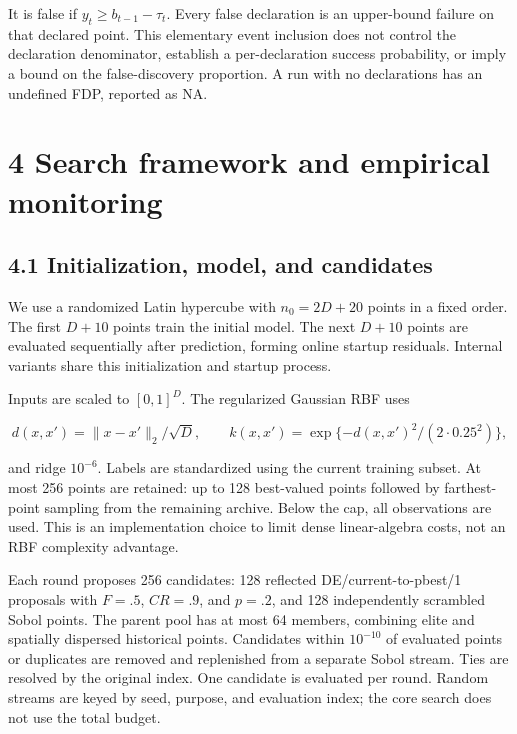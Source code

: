 \documentclass[11pt,a4paper]{article}
\begin{document}
It is false if \(y_t\ge b_{t-1}-\tau_t\). Every false declaration is an
upper-bound failure on that declared point. This elementary event
inclusion does not control the declaration denominator, establish a
per-declaration success probability, or imply a bound on the
false-discovery proportion. A run with no declarations has an undefined
FDP, reported as NA.

\hypertarget{search-framework-and-empirical-monitoring}{%
\section{4 Search framework and empirical
monitoring}\label{search-framework-and-empirical-monitoring}}

\hypertarget{initialization-model-and-candidates}{%
\subsection{4.1 Initialization, model, and
candidates}\label{initialization-model-and-candidates}}

We use a randomized Latin hypercube with \(n_0=2D+20\) points in a fixed
order. The first \(D+10\) points train the initial model. The next
\(D+10\) points are evaluated sequentially after prediction, forming
online startup residuals. Internal variants share this initialization
and startup process.

\par\noindent\begin{minipage}{\linewidth}

Inputs are scaled to \([0,1]^D\). The regularized Gaussian RBF uses

\[d(x,x')=\|x-x'\|_2/\sqrt D,\qquad k(x,x')=\exp\{-d(x,x')^2/(2\cdot0.25^2)\},\]

\end{minipage}\par

and ridge \(10^{-6}\). Labels are standardized using the current
training subset. At most 256 points are retained: up to 128 best-valued
points followed by farthest-point sampling from the remaining archive.
Below the cap, all observations are used. This is an implementation
choice to limit dense linear-algebra costs, not an RBF complexity
advantage.

Each round proposes 256 candidates: 128 reflected DE/current-to-pbest/1
proposals with \(F=.5\), \(CR=.9\), and \(p=.2\), and 128 independently
scrambled Sobol points. The parent pool has at most 64 members,
combining elite and spatially dispersed historical points. Candidates
within \(10^{-10}\) of evaluated points or duplicates are removed and
replenished from a separate Sobol stream. Ties are resolved by the
original index. One candidate is evaluated per round. Random streams are
keyed by seed, purpose, and evaluation index; the core search does not
use the total budget.
\end{document}
